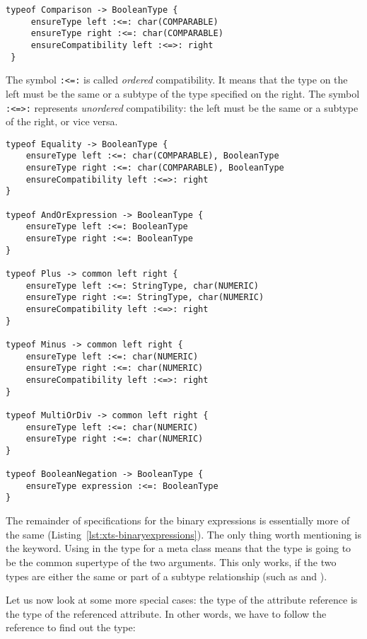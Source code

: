 \begin{lstlisting}[language=xts]
 typeof Comparison -> BooleanType {
     ensureType left :<=: char(COMPARABLE)
     ensureType right :<=: char(COMPARABLE)
     ensureCompatibility left :<=>: right
 } 
\end{lstlisting}


The symbol \verb|:<=:| is called \emph{ordered} compatibility. It
means that the type on the left must be the same or a subtype of the type
specified on the right. The symbol \verb|:<=>:| represents \emph{unordered}
compatibility: the left must be the same or a subtype of the right, or vice
versa.

\begin{lstlisting}[language=xts,float,label=lst:xts-binaryexpressions,caption=Some
rules for expressions.] 
typeof Equality -> BooleanType {
    ensureType left :<=: char(COMPARABLE), BooleanType
    ensureType right :<=: char(COMPARABLE), BooleanType
    ensureCompatibility left :<=>: right
}

typeof AndOrExpression -> BooleanType {
    ensureType left :<=: BooleanType
    ensureType right :<=: BooleanType 
}   

typeof Plus -> common left right {
    ensureType left :<=: StringType, char(NUMERIC)
    ensureType right :<=: StringType, char(NUMERIC)
    ensureCompatibility left :<=>: right
} 

typeof Minus -> common left right {
    ensureType left :<=: char(NUMERIC)
    ensureType right :<=: char(NUMERIC)
    ensureCompatibility left :<=>: right
} 

typeof MultiOrDiv -> common left right { 
    ensureType left :<=: char(NUMERIC)
    ensureType right :<=: char(NUMERIC)
} 

typeof BooleanNegation -> BooleanType {
    ensureType expression :<=: BooleanType
}
\end{lstlisting}

The remainder of specifications for the binary expressions is essentially more
of the same (Listing~\ref{lst:xts-binaryexpressions}).
The only thing worth mentioning is the  keyword. Using  in the
type for a meta class means that the type is going to be the common supertype of the two
arguments. This only works, if the two types are either the same or part of a
subtype relationship (such as  and ).

Let us now look at some more special cases: the type of the attribute reference
is the type of the referenced attribute. In other words, we have to follow the 
 reference to find out the type:

